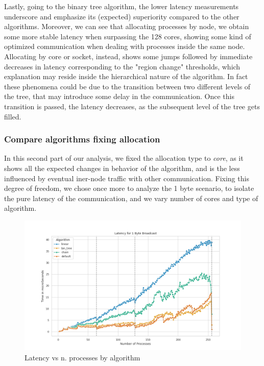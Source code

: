 \documentclass{article}
\begin{document}
	Lastly, going to the binary tree algorithm, the lower latency measurements underscore and emphasize its (expected) superiority compared to the other algorithms. Moreover, we can see that allocating processes by node, we obtain some more stable latency when surpassing the 128 cores, showing some kind of optimized communication when dealing with processes inside the same node.
	Allocating by core or socket, instead, shows some jumps followed by immediate decreases in latency corresponding to the "region change" thresholds, which explanation may reside inside the hierarchical nature of the algorithm. In fact these phenomena could be due to the transition between two different levels of the tree, that may introduce some delay in the communication. Once this transition is passed, the latency decreases, as the subsequent level of the tree gets filled.
	
	\subsubsection{Compare algorithms fixing allocation}
	
	In this second part of our analysis, we fixed the allocation type to \textit{core}, as it shows all the expected changes in behavior of the algorithm, and is the less influenced by eventual iner-node traffic with other communication. Fixing this degree of freedom, we chose once more to analyze the 1 byte scenario, to isolate the pure latency of the communication, and we vary number of cores and type of algorithm.
	
	\begin{figure}[h]
		\centering
		\includegraphics[width=0.9\linewidth]{../exercise1/plots/bcast_all_1byte}
		\caption{Latency vs n. processes by algorithm}
		\label{fig:bcastall1byte}
	\end{figure}
	
\end{document}

